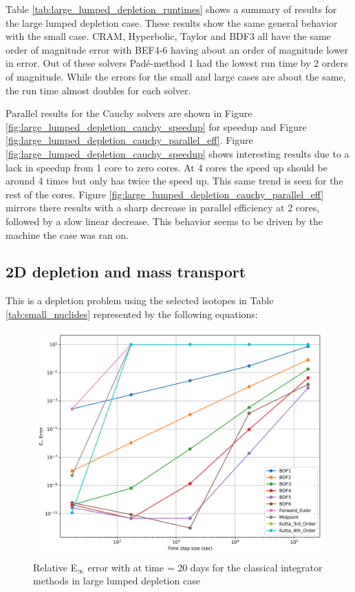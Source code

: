 Table \ref{tab:large_lumped_depletion_runtimes} shows a summary of results for the large lumped depletion case. These results show the same general behavior with the small case. CRAM, Hyperbolic, Taylor and BDF3 all have the same order of magnitude error with BEF4-6 having about an order of magnitude lower in error. Out of these solvers Pad\'e-method 1 had the lowest run time by 2 orders of magnitude. While the errors for the small and large cases are about the same, the run time almost doubles for each solver. 

Parallel results for the Cauchy solvers are shown in Figure \ref{fig:large_lumped_depletion_cauchy_speedup} for speedup and Figure \ref{fig:large_lumped_depletion_cauchy_parallel_eff}. Figure \ref{fig:large_lumped_depletion_cauchy_speedup} shows interesting results due to a lack in speedup from 1 core to zero cores. At 4 cores the speed up should be around 4 times but only has twice the speed up. This same trend is seen for the rest of the cores. Figure \ref{fig:large_lumped_depletion_cauchy_parallel_eff} mirrors there results with a sharp decrease in parallel efficiency at 2 cores, followed by a slow linear decrease. This behavior seems to be driven by the machine the case was ran on. 




\subsection{2D depletion and mass transport}
This is a depletion problem using the selected isotopes in Table \ref{tab:small_nuclides} represented by the following equations:

\begin{figure}[p]
    \centering
    \includegraphics[width=5in]{images/chapter-5/caseStudies/largeLumpedDepletion/msrLargeLumpedDepletionEinfErrorerrorIntegrators.png}
    \caption{Relative E$_{\infty}$ error with at time = 20 days for the classical integrator methods in large lumped depletion case}
    \label{fig:large_lumped_depletion_Einf_integrators}
\end{figure}

